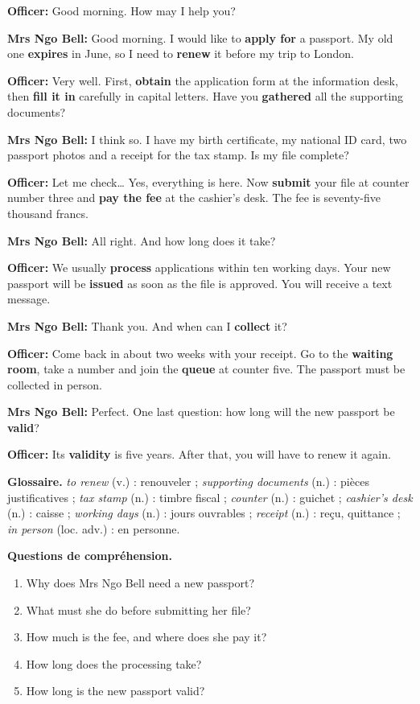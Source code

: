 \documentclass[11pt]{article}
\begin{document}
\begin{textebox}
\textbf{Officer:} Good morning. How may I help you?

\textbf{Mrs Ngo Bell:} Good morning. I would like to \textbf{apply for} a passport. My old one \textbf{expires} in June, so I need to \textbf{renew} it before my trip to London.

\textbf{Officer:} Very well. First, \textbf{obtain} the application form at the information desk, then \textbf{fill it in} carefully in capital letters. Have you \textbf{gathered} all the supporting documents?

\textbf{Mrs Ngo Bell:} I think so. I have my birth certificate, my national ID card, two passport photos and a receipt for the tax stamp. Is my file complete?

\textbf{Officer:} Let me check… Yes, everything is here. Now \textbf{submit} your file at counter number three and \textbf{pay the fee} at the cashier's desk. The fee is seventy-five thousand francs.

\textbf{Mrs Ngo Bell:} All right. And how long does it take?

\textbf{Officer:} We usually \textbf{process} applications within ten working days. Your new passport will be \textbf{issued} as soon as the file is approved. You will receive a text message.

\textbf{Mrs Ngo Bell:} Thank you. And when can I \textbf{collect} it?

\textbf{Officer:} Come back in about two weeks with your receipt. Go to the \textbf{waiting room}, take a number and join the \textbf{queue} at counter five. The passport must be collected in person.

\textbf{Mrs Ngo Bell:} Perfect. One last question: how long will the new passport be \textbf{valid}?

\textbf{Officer:} Its \textbf{validity} is five years. After that, you will have to renew it again.
\end{textebox}

\textbf{Glossaire.} \emph{to renew} (v.) : renouveler ; \emph{supporting documents} (n.) : pièces justificatives ; \emph{tax stamp} (n.) : timbre fiscal ; \emph{counter} (n.) : guichet ; \emph{cashier's desk} (n.) : caisse ; \emph{working days} (n.) : jours ouvrables ; \emph{receipt} (n.) : reçu, quittance ; \emph{in person} (loc. adv.) : en personne.

\textbf{Questions de compréhension.}
\begin{enumerate}
\item Why does Mrs Ngo Bell need a new passport?
\item What must she do before submitting her file?
\item How much is the fee, and where does she pay it?
\item How long does the processing take?
\item How long is the new passport valid?
\end{enumerate}
\end{document}
